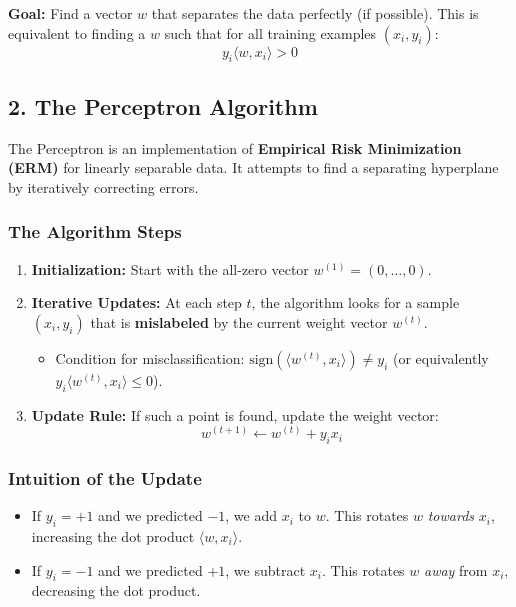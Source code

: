 \documentclass[
  italian,
  11pt,
]{article}
\providecommand{\tightlist}{%
  \setlength{\itemsep}{0pt}\setlength{\parskip}{0pt}}
\begin{document}
\textbf{Goal:} Find a vector \(w\) that separates the data perfectly (if
possible). This is equivalent to finding a \(w\) such that for all
training examples \((x_i, y_i)\): \[ y_i \langle w, x_i \rangle > 0 \]

\subsection{2. The Perceptron Algorithm}\label{the-perceptron-algorithm}

The Perceptron is an implementation of \textbf{Empirical Risk
Minimization (ERM)} for linearly separable data. It attempts to find a
separating hyperplane by iteratively correcting errors.

\subsubsection{The Algorithm Steps}\label{the-algorithm-steps}

\begin{enumerate}
\def\labelenumi{\arabic{enumi}.}
\tightlist
\item
  \textbf{Initialization:} Start with the all-zero vector
  \(w^{(1)} = (0, \dots, 0)\).
\item
  \textbf{Iterative Updates:} At each step \(t\), the algorithm looks
  for a sample \((x_i, y_i)\) that is \textbf{mislabeled} by the current
  weight vector \(w^{(t)}\).

  \begin{itemize}
  \tightlist
  \item
    Condition for misclassification:
    \(\text{sign}(\langle w^{(t)}, x_i \rangle) \neq y_i\) (or
    equivalently \(y_i \langle w^{(t)}, x_i \rangle \leq 0\)).
  \end{itemize}
\item
  \textbf{Update Rule:} If such a point is found, update the weight
  vector: \[ w^{(t+1)} \leftarrow w^{(t)} + y_i x_i \]
\end{enumerate}

\subsubsection{Intuition of the Update}\label{intuition-of-the-update}

\begin{itemize}
\tightlist
\item
  If \(y_i = +1\) and we predicted \(-1\), we add \(x_i\) to \(w\). This
  rotates \(w\) \emph{towards} \(x_i\), increasing the dot product
  \(\langle w, x_i \rangle\).
\item
  If \(y_i = -1\) and we predicted \(+1\), we subtract \(x_i\). This
  rotates \(w\) \emph{away} from \(x_i\), decreasing the dot product.
\end{itemize}
\end{document}
